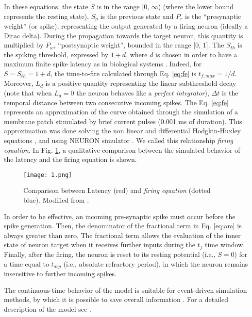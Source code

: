 \documentclass[review]{elsarticle}
\begin{document}
In these equations, the state $S$ is in the range [0, $\infty$) (where the lower bound represents the resting state), $S_p$ is the previous state and $P_r$ is the ``presynaptic weight'' (or spike), representing the output generated by a firing neuron (ideally a Dirac delta). During the propagation towards the target neuron, this quantity is multiplied by $P_w$, ``postsynaptic weight'', bounded in the range [0, 1]. The $S_{th}$ is the spiking threshold, expressed by $1+d$, where $d$ is chosen in order to have a maximum finite spike latency as in biological systems \cite{FitzHugh1955}. Indeed, for $S = S_{th} = 1+d$, the time-to-fire calculated through Eq. \ref{eq:fe} is $t_{f,max}=1/d$. Moreover, $L_d$ is a positive quantity representing the linear subthreshold decay (note that when $L_d = 0$ the neuron behaves like a \emph{perfect integrator}), $\Delta t$ is the temporal distance between two consecutive incoming spikes.
The Eq. \ref{eq:fe} represents an approximation of the curve obtained through the simulation of a membrane patch stimulated by brief current pulses (0.001 ms of duration). This approximation was done solving the non linear and differential Hodgkin-Huxley equations \cite{Hodgkin1939}, \cite{Hodgkin1952} and using NEURON simulator \cite{hines1997neuron}. We called this relationship \emph{firing equation}. In Fig. \ref{F:comparison_latency_firing_equation}, a qualitative comparison between the simulated behavior of the latency and the firing equation is shown.

\begin{figure}[!ht]
\centering
\texttt{[image: 1.png]}
 \caption{Comparison between Latency (red) and \emph{firing equation} (dotted blue). Modified from \cite{Cristini2015}.
 }
\label{F:comparison_latency_firing_equation}
\end{figure}

In order to be effective, an incoming pre-synaptic spike must occur before the spike generation. Then, the denominator of the fractional term in Eq. \ref{eq:am} is always greater than zero. The fractional term allows the evaluation of the inner state of neuron target when it receives further inputs during the $t_f$ time window. Finally, after the firing, the neuron is reset to its resting potential (i.e., $ S = 0$) for a time equal to $t_{arp}$ (i.e., absolute refractory period), in which the neuron remains insensitive to further incoming spikes.

The continuous-time behavior of the model is suitable for event-driven simulation methods, by which it is possible to save overall information \cite{Brette2007}. For a detailed description of the model see \cite{Cristini2015}.
\end{document}
